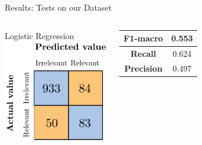 \documentclass{beamer}
\begin{document}
\begin{frame}{Results: Tests on our Dataset}
{\begin{columns}
				\centering
				Logistic Regression\vspace{0.7cm}\\
				\includegraphics[width=0.6\linewidth]{figures/ita_rel_logreg_afs.pdf}\\
				\begin{table}
					\centering
					\begin{tabular}{| c | c |}
						\hline
						\textbf{F1-macro} & 0.553 \\
						\hline
						\textbf{Recall} & 0.624 \\
						\hline
						\textbf{Precision} & 0.497 \\
						\hline
					\end{tabular}
				\end{table}
				
				
			\end{columns}
		
		}
\end{frame}
\end{document}
